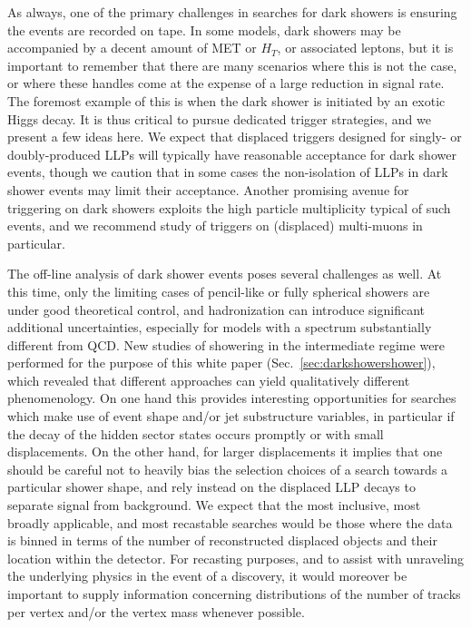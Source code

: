 As always, one of the primary challenges in searches for dark showers is ensuring the events are recorded on tape.  In some models, dark showers may be accompanied by a decent amount of MET or $H_T$, or associated leptons, but it is important to remember that there are many scenarios where this is not the case, or where these handles come at the expense of a large reduction in signal rate. The foremost example of this is when the dark shower is initiated by an exotic Higgs decay.  It is thus critical to pursue dedicated trigger strategies, and we present a few ideas here. We expect that displaced triggers designed for singly- or doubly-produced LLPs will typically have reasonable acceptance for dark shower events, though we caution that in some cases the non-isolation of LLPs in dark shower events may limit their acceptance.  Another promising avenue for triggering on dark showers exploits the high particle multiplicity typical of such events, and we recommend study of triggers on (displaced) multi-muons in particular.  

The off-line analysis of dark shower events poses several challenges as well.  At this time, only the limiting cases of pencil-like or fully spherical showers are under good theoretical control, and hadronization can introduce significant additional uncertainties, especially for models with a spectrum substantially different from QCD.  New studies of showering in the intermediate regime were performed for the purpose of this white paper (Sec.~\ref{sec:darkshowershower}), which revealed that different approaches can yield qualitatively different phenomenology.  On one hand this provides interesting opportunities for searches which make use of event shape and/or jet substructure variables, in particular if the decay of the hidden sector states occurs promptly or with small displacements. On the other hand, for larger displacements it implies that one should be careful not to heavily bias the selection choices of a search towards a particular shower shape, and rely instead on the displaced LLP decays to separate signal from background.  We expect that the most inclusive, most broadly applicable, and most recastable searches would be those where the data is binned in terms of the number of reconstructed displaced objects and their  location within the detector.  For recasting purposes, and to assist with unraveling the underlying physics in the event of a discovery, it would moreover be important to supply information concerning distributions of the number of tracks per vertex and/or the vertex mass whenever possible.


